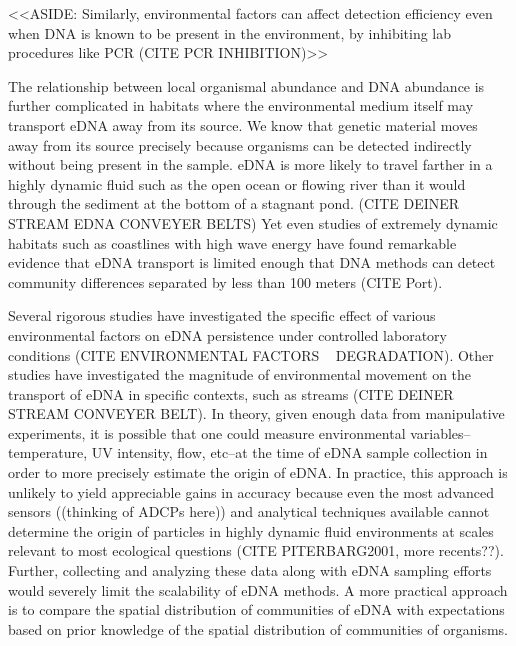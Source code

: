 \documentclass[11pt,letterpaper]{article} %
\begin{document}
<<ASIDE: Similarly, environmental factors can affect detection efficiency even when DNA is known to be present in the environment, by inhibiting lab procedures like PCR (CITE PCR INHIBITION)>>

The relationship between local organismal abundance and DNA abundance is further complicated in habitats where the environmental medium itself may transport eDNA away from its source.
We know that genetic material moves away from its source precisely because organisms can be detected indirectly without being present in the sample.
eDNA is more likely to travel farther in a highly dynamic fluid such as the open ocean or flowing river than it would through the sediment at the bottom of a stagnant pond.
(CITE DEINER STREAM EDNA CONVEYER BELTS)
Yet even studies of extremely dynamic habitats such as coastlines with high wave energy have found remarkable evidence that eDNA transport is limited enough that DNA methods can detect community differences separated by less than 100 meters (CITE Port).


Several rigorous studies have investigated the specific effect of various environmental factors on eDNA persistence under controlled laboratory conditions (CITE ENVIRONMENTAL FACTORS ~ DEGRADATION).
Other studies have investigated the magnitude of environmental movement on the transport of eDNA in specific contexts, such as streams (CITE DEINER STREAM CONVEYER BELT).
In theory, given enough data from manipulative experiments, it is possible that one could measure environmental variables--temperature, UV intensity, flow, etc--at the time of eDNA sample collection in order to more precisely estimate the origin of eDNA.
In practice, this approach is unlikely to yield appreciable gains in accuracy because even the most advanced sensors ((thinking of ADCPs here)) and analytical techniques available cannot determine the origin of particles in highly dynamic fluid environments at scales relevant to most ecological questions (CITE PITERBARG2001, more recents??).
Further, collecting and analyzing these data along with eDNA sampling efforts would severely limit the scalability of eDNA methods.
A more practical approach is to compare the spatial distribution of communities of eDNA with expectations based on prior knowledge of the spatial distribution of communities of organisms.
\end{document}
